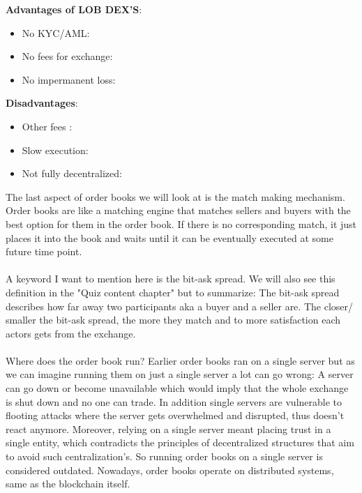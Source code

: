 \documentclass{article}
\begin{document}
\textbf{Advantages of LOB DEX'S}:
\begin{itemize}
    \item {No KYC/AML}: 
    \item {No fees for exchange}: 
    \item {No impermanent loss}: 
\end{itemize}
\textbf{Disadvantages}:
\begin{itemize}
    \item {Other fees }: 
    \item {Slow execution}: 
    \item {Not fully decentralized}:  
\end{itemize}
The last aspect of order books we will look at is the match making mechanism. Order books are like a matching engine that matches sellers and buyers with the best option for them in the order book. If there is no corresponding match, it just places it into the book and waits until it can be eventually executed at some future time point.\\
\\
A keyword I want to mention here is the bit-ask spread. We will also see this definition in the "Quiz content chapter" but to summarize: The bit-ask spread describes how far away two participants aka a buyer and a seller are. The closer/ smaller the bit-ask spread, the more they match and to more satisfaction each actors gets from the exchange.\\
\\
Where does the order book run? Earlier order books ran on a single server but as we can imagine running them on just a single server a lot can go wrong: A server can go down or become unavailable which would imply that the whole exchange is shut down and no one can trade. In addition single servers are vulnerable to flooting attacks where the server gets overwhelmed and disrupted, thus doesn't react anymore. Moreover, relying on a single server meant placing trust in a single entity, which contradicts the principles of decentralized structures that aim to avoid such centralization's. So running order books on a single server is considered outdated. Nowadays, order books operate on distributed systems, same as the blockchain itself.
\end{document}
